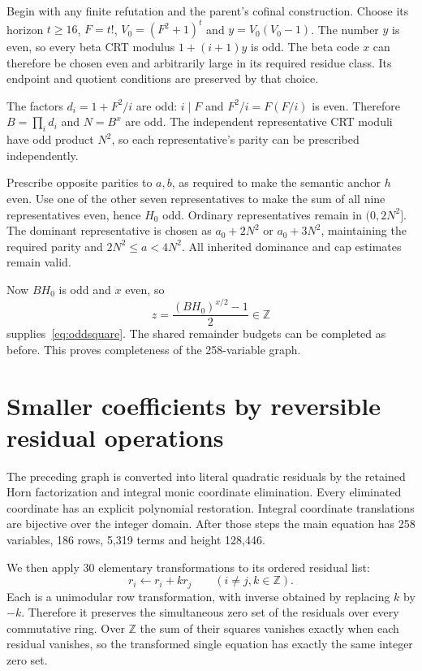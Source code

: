 \documentclass[11pt]{article}
\newcommand{\Z}{\mathbb Z}
\begin{document}
Begin with any finite refutation and the parent's cofinal construction.
Choose its horizon $t\ge16$, $F=t!$, $V_0=(F^2+1)^t$ and
$y=V_0(V_0-1)$. The number $y$ is even, so every beta CRT modulus
$1+(i+1)y$ is odd. The beta code $x$ can therefore be chosen even and
arbitrarily large in its required residue class. Its endpoint and quotient
conditions are preserved by that choice.

The factors $d_i=1+F^2/i$ are odd: $i\mid F$ and
$F^2/i=F(F/i)$ is even. Therefore $B=\prod_i d_i$ and $N=B^x$ are odd.
The independent representative CRT moduli have odd product $N^2$, so
each representative's parity can be prescribed independently.

Prescribe opposite parities to $a,b$, as required to make the semantic
anchor $h$ even. Use one of the other seven representatives to make the
sum of all nine representatives even, hence $H_0$ odd. Ordinary
representatives remain in $(0,2N^2]$. The dominant representative is
chosen as $a_0+2N^2$ or $a_0+3N^2$, maintaining the required parity and
$2N^2\le a<4N^2$. All inherited dominance and cap estimates remain valid.

Now $BH_0$ is odd and $x$ even, so
\[
 z=\frac{(BH_0)^{x/2}-1}{2}\in\Z
\]
supplies~\eqref{eq:oddsquare}. The shared remainder budgets can be
completed as before. This proves completeness of the 258-variable graph.

\section{Smaller coefficients by reversible residual operations}

The preceding graph is converted into literal quadratic residuals by the
retained Horn factorization and integral monic coordinate elimination.
Every eliminated coordinate has an explicit polynomial restoration.
Integral coordinate translations are bijective over the integer domain.
After those steps the main equation has 258 variables, 186 rows, 5,319
terms and height 128,446.

We then apply 30 elementary transformations to its ordered residual list:
\begin{equation}
 r_i\longleftarrow r_i+k r_j\qquad(i\ne j, k\in\Z).
 \label{eq:rowop}
\end{equation}
Each is a unimodular row transformation, with inverse obtained by
replacing $k$ by $-k$. Therefore it preserves the simultaneous zero set
of the residuals over every commutative ring. Over $\Z$ the sum of their
squares vanishes exactly when each residual vanishes, so the transformed
single equation has exactly the same integer zero set.
\end{document}

